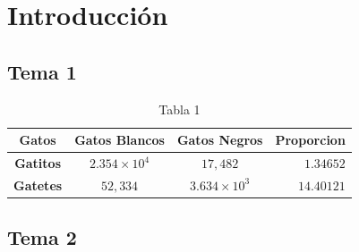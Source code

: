 \titleformat{\chapter}[display]
  {\normalfont\bfseries}{}{0pt}{\Huge}
\titlespacing{\chapter}{0pt}{0cm}{2pt}
\titleformat{\section}[display]
  {\normalfont\bfseries}{}{0pt}{\Large}
\titlespacing{\section}{0pt}{0cm}{1pt}

\chapter{Introducción}
\lipsum[1] %

\section{Tema 1} %
\lipsum[2-3] %

\begin{table}
	\centering
	\caption{Tabla 1}
	\label{tabla:1}
	\begin{tabular}{|c|c|c|r|}
		\hline
		\textbf{Gatos} & \textbf{Gatos Blancos} & \textbf{Gatos Negros} & \textbf{Proporcion} \\\hline
		\textbf{Gatitos} & $2.354\times10^4$ &  $17,482$ & $1.34652$\\
		\textbf{Gatetes} & $52,334$ & $3.634\times10^3$ & $14.40121$\\
		\hline
	\end{tabular}
\end{table}
\lipsum[4-5] %

\section{Tema 2} %
\lipsum[6-7]

